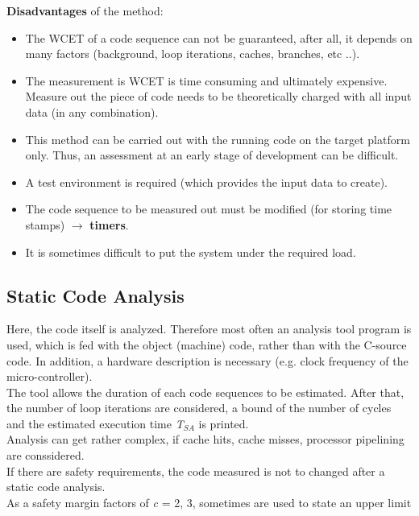 \begin{enumerate}
\textbf{Disadvantages} of the method:

\begin{itemize}
	\item  The WCET of a code sequence can not be guaranteed, after all, it depends on many factors (background, loop iterations, caches, branches, etc ..).
	\item  The measurement is WCET is time consuming and ultimately expensive. Measure out the piece of code needs to be theoretically charged with all input data (in any combination).
	\item  This method can be carried out with the running code on the target platform only. Thus, an assessment at an early stage of development can be difficult.
	\item  A test environment is required (which provides the input data to create).
	\item  The code sequence to be measured out must be modified (for storing time stamps) $\rightarrow$ \textbf{timers}.
	\item  It is sometimes difficult to put the system under the required load.
\end{itemize}
\end{enumerate}

\subsection{Static Code Analysis}

Here, the code itself is analyzed. Therefore most often an analysis tool program is used, which is fed with the object (machine) code, rather than with the C-source code. In addition, a hardware description is necessary (e.g. clock frequency of the micro-controller). \\

The tool allows the duration of each code sequences to be estimated. After that, the number of loop iterations are considered, a bound of the number of cycles and the estimated execution time \textit{T${}_{SA}$} is printed.\\

Analysis can get rather complex, if cache hits, cache misses, processor pipelining are conssidered. \\

If there are safety requirements, the code measured is not to changed after a static code analysis.\\

As a safety margin factors of \textit{c} = 2, 3, sometimes are used to state an upper limit\\

